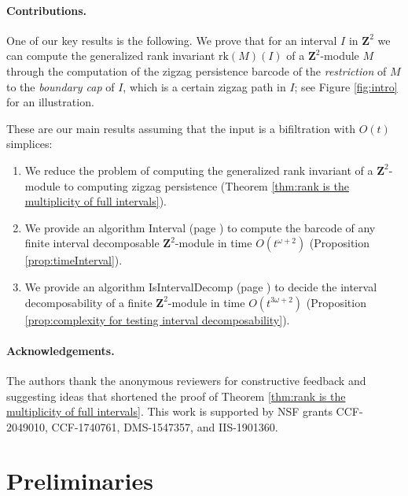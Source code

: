 \documentclass[11pt]{article}
\theoremstyle{definition}
\newcommand{\Z}{\mathbf{Z}}
\newcommand{\rk}{\mathrm{rk}}
\begin{document}
\paragraph{Contributions.}

One of our key results is the following. We prove that for an interval $I$ in $\Z^2$ we can compute the generalized rank invariant $\rk(M)(I)$ of a $\Z^2$-module $M$ through the computation of the zigzag persistence barcode of the \emph{restriction} of $M$ to the \emph{boundary cap} of $I$, which is a certain zigzag path in $I$; see Figure \ref{fig:intro} for an illustration. 


\medskip These are our main results assuming that the input is a bifiltration with $O(t)$ simplices:

\begin{enumerate}
    \item We reduce the problem of computing the generalized rank invariant of a $\Z^2$-module to computing zigzag persistence (Theorem \ref{thm:rank is the multiplicity of full intervals}).

    \item We provide an algorithm {\sc Interval} (page \pageref{algorithm:interval}) to compute the barcode of any finite interval decomposable $\Z^2$-module in time $O(t^{\omega+2})$ (Proposition \ref{prop:timeInterval}). 
    
    \item We provide an algorithm {\sc IsIntervalDecomp} (page \pageref{algorithm:isintervaldecomp}) to decide the interval decomposability of a finite $\Z^2$-module in time $O(t^{3\omega+2})$ (Proposition \ref{prop:complexity for testing interval decomposability}). 
\end{enumerate}


\paragraph{Acknowledgements.} The authors thank the anonymous reviewers for constructive feedback and suggesting ideas that shortened the proof of Theorem \ref{thm:rank is the multiplicity of full intervals}. This work is supported by NSF grants CCF-2049010, CCF-1740761, DMS-1547357, and IIS-1901360.


\section{Preliminaries}\label{sec:preliminaries}
\end{document}
